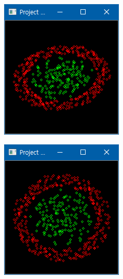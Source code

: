 \documentclass[10pt]{oblivoir}
\begin{document}
\begin{figure}[ht]
    \centering
    \begin{subfigure}{0.3\textwidth}
        \includegraphics[width=\textwidth]{img/kernel-project-0.png}
    \end{subfigure}
    \begin{subfigure}{0.3\textwidth}
        \includegraphics[width=\textwidth]{img/kernel-project-1.png}

\end{subfigure}
\end{figure}
\end{document}
